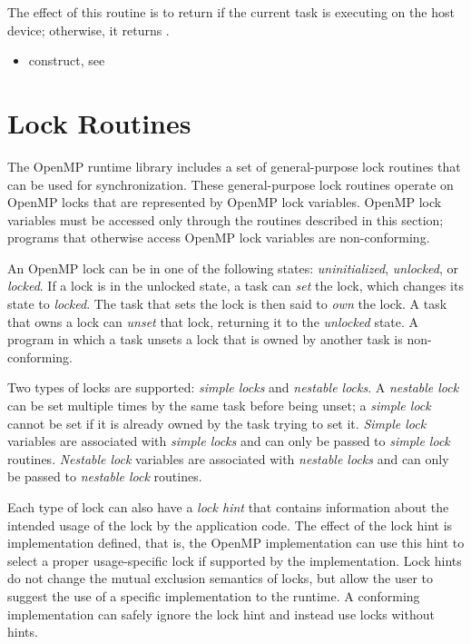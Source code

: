 \effect
The effect of this routine is to return  if the current task is executing on the host 
device; otherwise, it returns .

\crossreferences
\begin{itemize}
\item {} construct, see 
\end{itemize}










\newpage
\section{Lock Routines}
\label{sec:Lock Routines}
The OpenMP runtime library includes a set of general-purpose lock routines that can be 
used for synchronization. These general-purpose lock routines operate on OpenMP locks 
that are represented by OpenMP lock variables. OpenMP lock variables must be 
accessed only through the routines described in this section; programs that otherwise 
access OpenMP lock variables are non-conforming.

An OpenMP lock can be in one of the following states: \emph{uninitialized}, \emph{unlocked}, or 
\emph{locked}. If a lock is in the unlocked state, a task can \emph{set} the lock, which changes its state 
to \emph{locked}. The task that sets the lock is then said to \emph{own} the lock. A task that owns a 
lock can \emph{unset} that lock, returning it to the \emph{unlocked} state. A program in which a task 
unsets a lock that is owned by another task is non-conforming.

Two types of locks are supported: \emph{simple locks} and \emph{nestable locks}. A \emph{nestable lock} can 
be set multiple times by the same task before being unset; a \emph{simple lock} cannot be set if 
it is already owned by the task trying to set it. \emph{Simple lock} variables are associated with 
\emph{simple locks} and can only be passed to \emph{simple lock} routines. \emph{Nestable lock} variables are 
associated with \emph{nestable locks} and can only be passed to \emph{nestable lock} routines.

Each type of lock can also have a \emph{lock hint} that contains information about the intended usage 
of the lock by the application code.  The effect of the lock hint is implementation defined, 
that is, the OpenMP implementation can use this hint to select a proper 
usage-specific lock if supported by the implementation.  
Lock hints do not change the mutual exclusion semantics of locks, but allow the 
user to suggest the use of a specific implementation to the runtime.
A conforming implementation can safely ignore the lock hint and instead use locks without hints.

